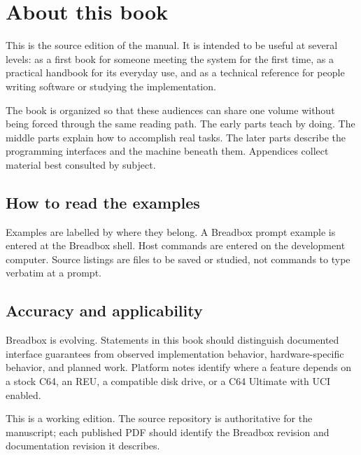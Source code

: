 \chapter*{About this book}

This is the source edition of the \Breadbox{} manual. It is intended to be useful at several levels: as a first book for someone meeting the system for the first time, as a practical handbook for its everyday use, and as a technical reference for people writing software or studying the implementation.

The book is organized so that these audiences can share one volume without being forced through the same reading path. The early parts teach by doing. The middle parts explain how to accomplish real tasks. The later parts describe the programming interfaces and the machine beneath them. Appendices collect material best consulted by subject.

\section*{How to read the examples}
Examples are labelled by where they belong. A Breadbox prompt example is entered at the Breadbox shell. Host commands are entered on the development computer. Source listings are files to be saved or studied, not commands to type verbatim at a prompt.

\section*{Accuracy and applicability}
Breadbox is evolving. Statements in this book should distinguish documented interface guarantees from observed implementation behavior, hardware-specific behavior, and planned work. Platform notes identify where a feature depends on a stock C64, an REU, a compatible disk drive, or a C64 Ultimate with UCI enabled.

This is a working edition. The source repository is authoritative for the manuscript; each published PDF should identify the Breadbox revision and documentation revision it describes.

